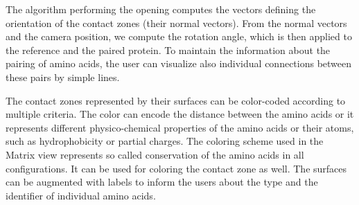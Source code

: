 \documentclass{bmcart}
\def\ExpView {Exploded view\xspace}
\def\MatView {Matrix view\xspace}
\begin{document}
The algorithm performing the opening computes the vectors defining the orientation of the contact zones (their normal vectors). 
From the normal vectors and the camera position, we compute the rotation angle, which is then applied to the reference and the paired protein.
To maintain the information about the pairing of amino acids, the user can visualize also individual connections between these pairs by simple lines.


The contact zones represented by their surfaces can be color-coded according to multiple criteria.
The color can encode the distance between the amino acids or it represents different physico-chemical properties of the amino acids or their atoms, such as hydrophobicity or partial charges.
The coloring scheme used in the \MatView represents so called conservation of the amino acids in all configurations.
It can be used for coloring the contact zone as well.
The surfaces can be augmented with labels to inform the users about the type and the identifier of individual amino acids.
\end{document}
